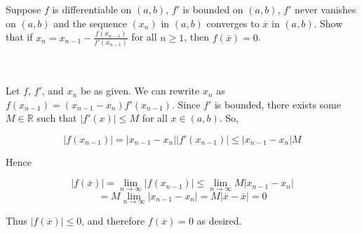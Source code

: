 Suppose $f$ is differentiable on $(a,b)$, $f'$ is bounded on $(a,b)$, $f'$ never vanishes on $(a,b)$ and
the sequence $(x_n)$ in $(a,b)$ converges to $\overline{x}$ in $(a,b)$. Show that if
$x_n=x_{n-1}-\frac{f(x_{n-1})}{f'(x_{n-1})}$ for all $n\geq1$, then $f(\overline{x})=0$.\\\\

\begin{solution}\renewcommand{\qedsymbol}{}\ \\
    Let $f$, $f'$, and $x_n$ be as given. We can rewrite $x_n$ as $f(x_{n-1})=(x_{n-1}-x_n)f'(x_{n-1})$.
    Since $f'$ is bounded, there exists some $M\in\mathbb{R}$ such that $|f'(x)|\leq M$ for all
    $x\in(a,b)$. So,
    
    $$|f(x_{n-1})|=|x_{n-1}-x_n||f'(x_{n-1})|\leq|x_{n-1}-x_n|M$$
    
    Hence
    
    $$|f(\overline{x})|=\lim_{n\to\infty}|f(x_{n-1})|\leq\lim_{n\to\infty}M|x_{n-1}-x_n|$$
    $$=M\lim_{n\rightarrow\infty}|x_{n-1}-x_n|=M|\overline{x}-\overline{x}|=0$$
    
    Thus $|f(\overline{x})|\leq0$, and therefore $f(\overline{x})=0$ as desired.

\end{solution}